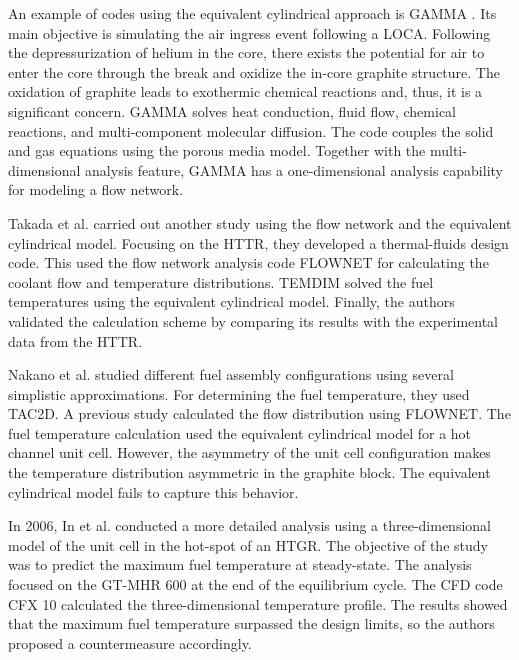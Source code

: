 An example of codes using the equivalent cylindrical approach is GAMMA \cite{no_multi-component_2007}.
Its main objective is simulating the air ingress event following a LOCA.
Following the depressurization of helium in the core, there exists the potential for air to enter the core through the break and oxidize the in-core graphite structure.
The oxidation of graphite leads to exothermic chemical reactions and, thus, it is a significant concern.
GAMMA solves heat conduction, fluid flow, chemical reactions, and multi-component molecular diffusion.
The code couples the solid and gas equations using the porous media model.
Together with the multi-dimensional analysis feature, GAMMA has a one-dimensional analysis capability for  modeling a flow network.

Takada et al. \cite{takada_core_2004} carried out another study using the flow network and the equivalent cylindrical model.
Focusing on the \gls{HTTR}, they developed a thermal-fluids design code.
This used the flow network analysis code FLOWNET \cite{maruyama_verification_1988} for calculating the coolant flow and temperature distributions.
TEMDIM \cite{maruyama_verification_1988} solved the fuel temperatures using the equivalent cylindrical model.
Finally, the authors validated the calculation scheme by comparing its results with the experimental data from the \gls{HTTR}.

Nakano et al. \cite{nakano_conceptual_2008} studied different fuel assembly configurations using several simplistic approximations.
For determining the fuel temperature, they used TAC2D.
A previous study calculated the flow distribution using FLOWNET.
The fuel temperature calculation used the equivalent cylindrical model for a hot channel unit cell.
However, the asymmetry of the unit cell configuration makes the temperature distribution asymmetric in the graphite block.
The equivalent cylindrical model fails to capture this behavior.

In 2006, In et al. \cite{in_three-dimensional_2006} conducted a more detailed analysis using a three-dimensional model of the unit cell in the hot-spot of an \gls{HTGR}.
The objective of the study was to predict the maximum fuel temperature at steady-state.
The analysis focused on the GT-MHR 600 at the end of the equilibrium cycle.
The CFD code CFX 10 \cite{ansys_inc_cfx_2006} calculated the three-dimensional temperature profile.
The results showed that the maximum fuel temperature surpassed the design limits, so the authors proposed a countermeasure accordingly.

